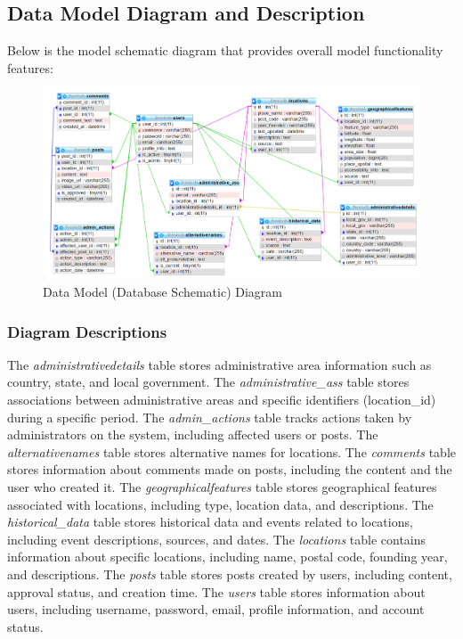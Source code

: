 \subsection{Data Model Diagram and Description}
Below is the model schematic diagram that provides overall model functionality features:

\begin{figure}[H]
    \centering
    \includegraphics[width=1\linewidth]{model_schema.png}
    \caption{Data Model (Database Schematic) Diagram}
    \label{fig:enter-label}
\end{figure}

\subsubsection{Diagram Descriptions}
The \textit{administrativedetails} table stores administrative area information such as country, state, and local government. The \textit{administrative\_ass} table stores associations between administrative areas and specific identifiers (location\_id) during a specific period. The \textit{admin\_actions} table tracks actions taken by administrators on the system, including affected users or posts. The \textit{alternativenames} table stores alternative names for locations. The \textit{comments} table stores information about comments made on posts, including the content and the user who created it. The \textit{geographicalfeatures} table stores geographical features associated with locations, including type, location data, and descriptions. The \textit{historical\_data} table stores historical data and events related to locations, including event descriptions, sources, and dates. The \textit{locations} table contains information about specific locations, including name, postal code, founding year, and descriptions. The \textit{posts} table stores posts created by users, including content, approval status, and creation time. The \textit{users} table stores information about users, including username, password, email, profile information, and account status.

